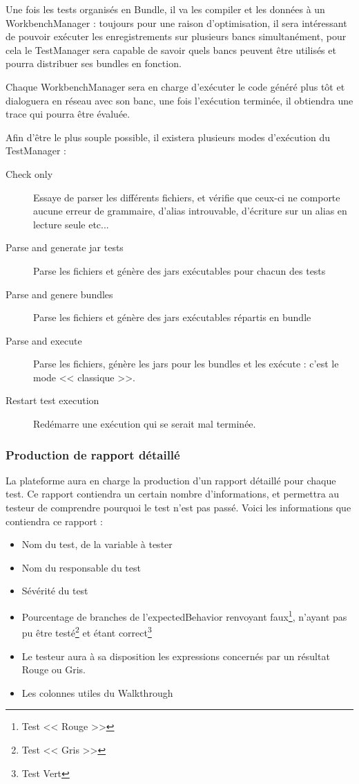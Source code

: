 	Une fois les tests organisés en Bundle, il va les compiler et les données à un WorkbenchManager : toujours pour une raison d'optimisation, il sera intéressant de pouvoir exécuter les enregistrements sur plusieurs bancs simultanément, pour cela le TestManager sera capable de savoir quels bancs peuvent être utilisés et pourra distribuer ses bundles en fonction. 

	Chaque WorkbenchManager sera en charge d'exécuter le code généré plus tôt et dialoguera en réseau avec son banc, une fois l'exécution terminée, il obtiendra une trace qui pourra être évaluée.

	Afin d'être le plus souple possible, il existera plusieurs modes d'exécution du TestManager : 
	\begin{description}
		\item[Check only] Essaye de parser les différents fichiers, et vérifie que ceux-ci ne comporte aucune erreur de grammaire, d'alias introuvable, d'écriture sur un alias en lecture seule etc...
		\item[Parse and generate jar tests] Parse les fichiers et génère des jars exécutables pour chacun des tests
		\item[Parse and genere bundles] Parse les fichiers et génère des jars exécutables répartis en bundle
		\item[Parse and execute] Parse les fichiers, génère les jars pour les bundles et les exécute : c'est le mode << classique >>.
		\item[Restart test execution] Redémarre une exécution qui se serait mal terminée.
	\end{description}
	\subsubsection{Production de rapport détaillé}\label{report}
	La plateforme aura en charge la production d'un rapport détaillé pour chaque test. Ce rapport contiendra un certain nombre d'informations, et permettra au testeur de comprendre pourquoi le test n'est pas passé. Voici les informations que contiendra ce rapport : 

	\begin{itemize}
		\item Nom du test, de la variable à tester
		\item Nom du responsable du test
		\item Sévérité du test
		\item Pourcentage de branches de l'expectedBehavior renvoyant faux\footnote{Test << Rouge >>}, n'ayant pas pu être testé\footnote{Test << Gris >>} et étant correct\footnote{Test Vert}
		\item Le testeur aura à sa disposition les expressions concernés par un résultat Rouge ou Gris.
		\item Les colonnes utiles du Walkthrough
	\end{itemize}

